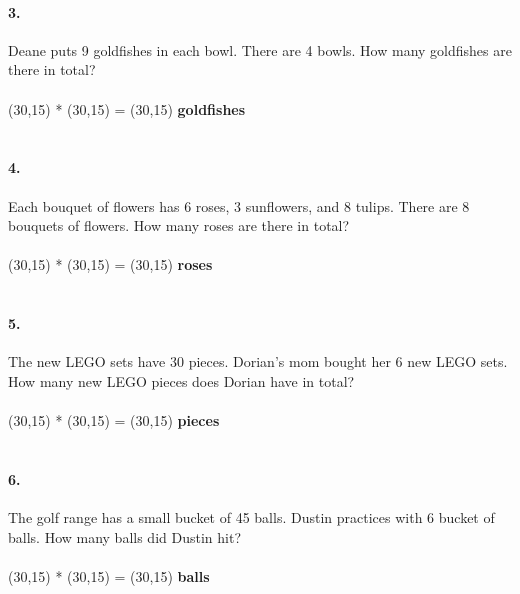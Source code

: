 \documentclass[12pt]{article}
\begin{document}
\paragraph{3.}
Deane puts 9 goldfishes in each bowl. There are 4 bowls. How many goldfishes are there in total?
\\
\\
\framebox(30,15){} * \framebox(30,15){} = \framebox(30,15){} \textbf{goldfishes}
\\
\\
\paragraph{4.}
Each bouquet of flowers has 6 roses, 3 sunflowers, and 8 tulips. There are 8 bouquets of flowers. How many roses are there in total?
\\
\\
\framebox(30,15){} * \framebox(30,15){} = \framebox(30,15){} \textbf{roses}
\\
\\
\paragraph{5.}
The new LEGO sets have 30 pieces. Dorian's mom bought her 6 new LEGO sets. How many new LEGO pieces does Dorian have in total?
\\
\\
\framebox(30,15){} * \framebox(30,15){} = \framebox(30,15){} \textbf{pieces}
\\
\\
\paragraph{6.}
The golf range has a small bucket of 45 balls. Dustin practices with 6 bucket of balls. How many balls did Dustin hit?
\\
\\
\framebox(30,15){} * \framebox(30,15){} = \framebox(30,15){} \textbf{balls}
\end{document}
